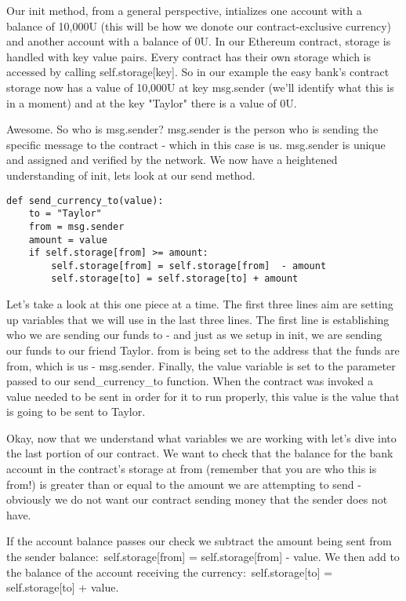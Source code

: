 \documentclass[12pt]{article}
\begin{document}
Our init method, from a general perspective, intializes one account with a balance of 10,000U (this will be how we donote our contract-exclusive currency) and another account with a balance of 0U. In our Ethereum contract, storage is handled with key value pairs. Every contract has their own storage which is accessed by calling self.storage[key]. So in our example the easy bank's contract storage now has a value of 10,000U at key msg.sender (we'll identify what this is in a moment) and at the key "Taylor" there is a value of 0U. 

 Awesome. So who is msg.sender? msg.sender is the person who is sending the specific message to the contract - which in this case is us. msg.sender is unique and assigned and verified by the network. We now have a heightened understanding of init, lets look at our send method.



\begin{lstlisting}[frame=single]
def send_currency_to(value):
	to = "Taylor"
	from = msg.sender
	amount = value
	if self.storage[from] >= amount:
		self.storage[from] = self.storage[from]  - amount
		self.storage[to] = self.storage[to] + amount
\end{lstlisting}

Let's take a look at this one piece at a time. The first three lines aim are setting up variables that we will use in the last three lines. The first line is establishing who we are sending our funds to - and just as we setup in init, we are sending our funds to our friend Taylor. 
from is being set to the address that the funds are from, which is us - msg.sender. Finally, the value variable is set to the parameter passed to our send\_currency\_to function. When the contract was invoked a value needed to be sent in order for it to run properly, this value is the value that is going to be sent to Taylor.

Okay, now that we understand what variables we are working with let's dive into the last portion of our contract. We want to check that the balance for the bank account in the contract's storage at from (remember that you are who this is from!) is greater than or equal to the amount we are attempting to send - obviously we do not want our contract sending money that the sender does not have.

If the account balance passes our check we subtract the amount being sent from the sender balance: self.storage[from] = self.storage[from] - value. We then add to the balance of the account receiving the currency: self.storage[to] = self.storage[to] + value.
\end{document}
